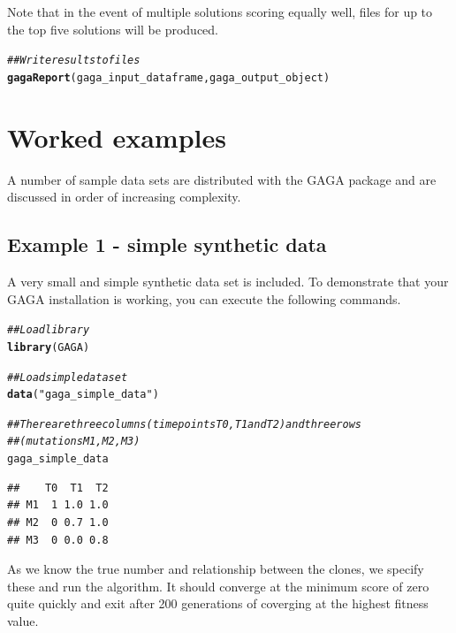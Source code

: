 \documentclass[a4paper]{article}\usepackage[]{graphicx}\usepackage[]{color}
\makeatletter
\newcommand{\hlstr}[1]{\textcolor[rgb]{0.192,0.494,0.8}{#1}}%
\newcommand{\hlcom}[1]{\textcolor[rgb]{0.678,0.584,0.686}{\textit{#1}}}%
\newcommand{\hlstd}[1]{\textcolor[rgb]{0.345,0.345,0.345}{#1}}%
\newcommand{\hlkwd}[1]{\textcolor[rgb]{0.737,0.353,0.396}{\textbf{#1}}}%
\newenvironment{kframe}{%
 \def\at@end@of@kframe{}%
 \ifinner\ifhmode%
  \def\at@end@of@kframe{\end{minipage}}%
  \begin{minipage}{\columnwidth}%
 \fi\fi%
 \def\FrameCommand##1{\hskip\@totalleftmargin \hskip-\fboxsep
 \colorbox{shadecolor}{##1}\hskip-\fboxsep
     \hskip-\linewidth \hskip-\@totalleftmargin \hskip\columnwidth}%
 \MakeFramed {\advance\hsize-\width
   \@totalleftmargin\z@ \linewidth\hsize
   \@setminipage}}%
 {\par\unskip\endMakeFramed%
 \at@end@of@kframe}
\newenvironment{knitrout}{}{} %
\makeatother
\begin{document}
Note that in the event of multiple solutions scoring equally well, files for up to the top five solutions will be produced.

\begin{knitrout}
\color{fgcolor}\begin{kframe}
\begin{alltt}
\hlcom{## Write results to files}
\hlkwd{gagaReport}\hlstd{(gaga_input_dataframe, gaga_output_object)}
\end{alltt}
\end{kframe}
\end{knitrout}



\section{Worked examples}
A number of sample data sets are distributed with the GAGA package and are discussed in order of increasing complexity.
\subsection{Example 1 - simple synthetic data}
A very small and simple synthetic data set is included.  To demonstrate that your GAGA installation is working, you can execute the following commands.  
\begin{knitrout}
\color{fgcolor}\begin{kframe}
\begin{alltt}
\hlcom{## Load library}
\hlkwd{library}\hlstd{(GAGA)}

\hlcom{## Load simple data set}
\hlkwd{data}\hlstd{(}\hlstr{"gaga_simple_data"}\hlstd{)}

\hlcom{## There are three columns (time points T0, T1 and T2) and three rows}
\hlcom{## (mutations M1, M2, M3)}
\hlstd{gaga_simple_data}
\end{alltt}
\begin{verbatim}
##    T0  T1  T2
## M1  1 1.0 1.0
## M2  0 0.7 1.0
## M3  0 0.0 0.8
\end{verbatim}
\end{kframe}
\end{knitrout}


As we know the true number and relationship between the clones, we specify these and run the algorithm.  It should converge at the minimum score of zero quite quickly and exit after 200 generations of coverging at the highest fitness value.
\end{document}
